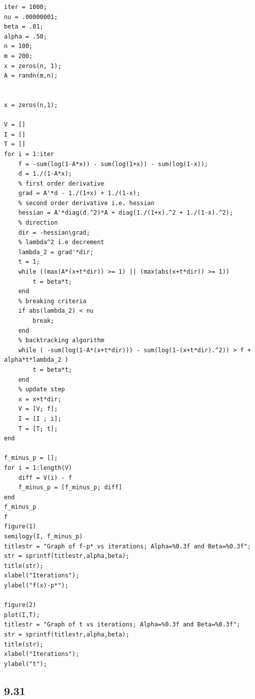 \documentclass[12pt]{article}
\begin{document}
\begin{lstlisting}
iter = 1000;
nu = .00000001;
beta = .01;
alpha = .50;
n = 100;
m = 200;
x = zeros(n, 1);
A = randn(m,n);


x = zeros(n,1);

V = []
I = []
T = []
for i = 1:iter
    f = -sum(log(1-A*x)) - sum(log(1+x)) - sum(log(1-x));
    d = 1./(1-A*x);
    % first order derivative
    grad = A'*d - 1./(1+x) + 1./(1-x);
    % second order derivative i.e. hessian
    hessian = A'*diag(d.^2)*A + diag(1./(1+x).^2 + 1./(1-x).^2);
    % direction
    dir = -hessian\grad;
    % lambda^2 i.e decrement
    lambda_2 = grad'*dir;
    t = 1; 
    while ((max(A*(x+t*dir)) >= 1) || (max(abs(x+t*dir)) >= 1))
        t = beta*t;
    end
    % breaking criteria
    if abs(lambda_2) < nu
        break;
    end
    % backtracking algorithm
    while ( -sum(log(1-A*(x+t*dir))) - sum(log(1-(x+t*dir).^2)) > f + alpha*t*lambda_2 )
        t = beta*t;
    end
    % update step
    x = x+t*dir;
    V = [V; f];
    I = [I ; i];
    T = [T; t];
end

f_minus_p = [];
for i = 1:length(V)
    diff = V(i) - f
    f_minus_p = [f_minus_p; diff]
end
f_minus_p
f
figure(1)
semilogy(I, f_minus_p)
titlestr = "Graph of f-p* vs iterations; Alpha=%0.3f and Beta=%0.3f";
str = sprintf(titlestr,alpha,beta);
title(str);
xlabel("Iterations");
ylabel("f(x)-p*");

figure(2)
plot(I,T);
titlestr = "Graph of t vs iterations; Alpha=%0.3f and Beta=%0.3f";
str = sprintf(titlestr,alpha,beta);
title(str);
xlabel("Iterations");
ylabel("t");
\end{lstlisting}

\subsection*{9.31}


 
\end{document}

